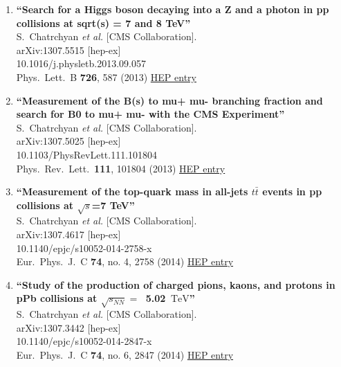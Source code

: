 \documentclass{article}
\begin{document}
\begin{enumerate}
\item%
{\bf ``Search for a Higgs boson decaying into a Z and a photon in pp collisions at sqrt(s) = 7 and 8 TeV''}
  \\{}S.~Chatrchyan {\it et al.} [CMS Collaboration].
  \\{}arXiv:1307.5515 [hep-ex]
    \\{}10.1016/j.physletb.2013.09.057
\\{}Phys.\ Lett.\ B {\bf 726}, 587 (2013) %
\href{http://inspirehep.net/record/1243861}{HEP entry}


\item%
{\bf ``Measurement of the B(s) to mu+ mu- branching fraction and search for B0 to mu+ mu- with the CMS Experiment''}
  \\{}S.~Chatrchyan {\it et al.} [CMS Collaboration].
  \\{}arXiv:1307.5025 [hep-ex]
    \\{}10.1103/PhysRevLett.111.101804
\\{}Phys.\ Rev.\ Lett.\  {\bf 111}, 101804 (2013) %
\href{http://inspirehep.net/record/1243425}{HEP entry}


\item%
{\bf ``Measurement of the top-quark mass in all-jets $t\bar{t}$ events in pp collisions at $\sqrt{s}$=7 TeV''}
  \\{}S.~Chatrchyan {\it et al.} [CMS Collaboration].
  \\{}arXiv:1307.4617 [hep-ex]
    \\{}10.1140/epjc/s10052-014-2758-x
\\{}Eur.\ Phys.\ J.\ C {\bf 74}, no. 4, 2758 (2014) %
\href{http://inspirehep.net/record/1243161}{HEP entry}


\item%
{\bf ``Study of the production of charged pions, kaons, and protons in pPb collisions at $\sqrt{s_{NN}} =\  $ 5.02 $\,\text {TeV}$''}
  \\{}S.~Chatrchyan {\it et al.} [CMS Collaboration].
  \\{}arXiv:1307.3442 [hep-ex]
    \\{}10.1140/epjc/s10052-014-2847-x
\\{}Eur.\ Phys.\ J.\ C {\bf 74}, no. 6, 2847 (2014) %
\href{http://inspirehep.net/record/1242440}{HEP entry}



\end{enumerate}
\end{document}
